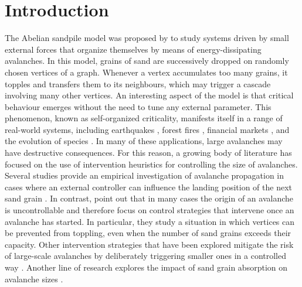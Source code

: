 \documentclass{article}
\begin{document}
\section{Introduction}
\label{Introduction}
The Abelian sandpile model was proposed by \citet{Bak1, Bak2} to study systems driven by small external forces that organize themselves by means of energy-dissipating avalanches. In this model, grains of sand are successively dropped on randomly chosen vertices of a graph. Whenever a vertex accumulates too many grains, it topples and transfers them to its neighbours, which may trigger a cascade involving many other vertices. An interesting aspect of the model is that critical behaviour emerges without the need to tune any external parameter. This phenomenon, known as self-organized criticality, manifests itself in a range of real-world systems, including earthquakes \citep{Scholz}, forest fires \citep{Drossel}, financial markets \citep{Bartolozzi}, and the evolution of species \citep{Bak3}. In many of these applications, large avalanches may have destructive consequences. For this reason, a growing body of literature has focused on the use of intervention heuristics for controlling the size of avalanches. Several studies provide an empirical investigation of avalanche propagation in cases where an external controller can influence the landing position of the next sand grain \citep{Cajueiro1, Falk, Noel, Parsaeifard, Turalska}. In contrast, \citet{Qi} point out that in many cases the origin of an avalanche is uncontrollable and therefore focus on control strategies that intervene once an avalanche has started. In particular, they study a situation in which vertices can be prevented from toppling, even when the number of sand grains exceeds their capacity. Other intervention strategies that have been explored mitigate the risk of large-scale avalanches by deliberately triggering smaller ones in a controlled way \citep{Cajueiro2, Cajueiro3, Hou}. Another line of research explores the impact of sand grain absorption on avalanche sizes \citep{Scala}. 
\end{document}
